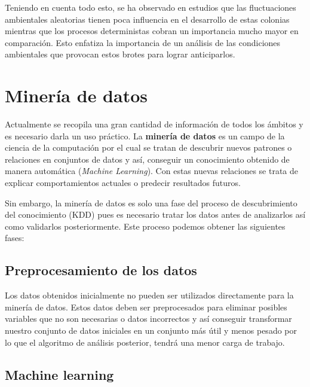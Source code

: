 Teniendo en cuenta todo esto, se ha observado en estudios que las fluctuaciones ambientales aleatorias tienen poca influencia en el desarrollo de estas colonias mientras que los procesos deterministas cobran un importancia mucho mayor en comparación. Esto enfatiza la importancia de un análisis de las condiciones ambientales que provocan estos brotes para lograr anticiparlos.

\section{Minería de datos}
Actualmente se recopila una gran cantidad de información de todos los ámbitos y es necesario darla un uso práctico. La \textbf{minería de datos} es un campo de la ciencia de la computación por el cual se tratan de descubrir nuevos patrones o relaciones en conjuntos de datos y así, conseguir un conocimiento obtenido de manera automática (\emph{Machine Learning}). Con estas nuevas relaciones se trata de explicar comportamientos actuales o predecir resultados futuros. \cite{mineria_tecnicas_herramientas}

Sin embargo, la minería de datos es solo una fase del proceso de descubrimiento del conocimiento (KDD) pues es necesario tratar los datos antes de analizarlos así como validarlos posteriormente. Este proceso podemos obtener las siguientes fases:


\subsection{Preprocesamiento de los datos}
Los datos obtenidos inicialmente no pueden ser utilizados directamente para la minería de datos. Estos datos deben ser preprocesados para eliminar posibles variables que no son necesarias o datos incorrectos y así conseguir transformar nuestro conjunto de datos iniciales en un conjunto más útil y menos pesado por lo que el algoritmo de análisis posterior, tendrá una menor carga de trabajo. 

\subsection{Machine learning}







